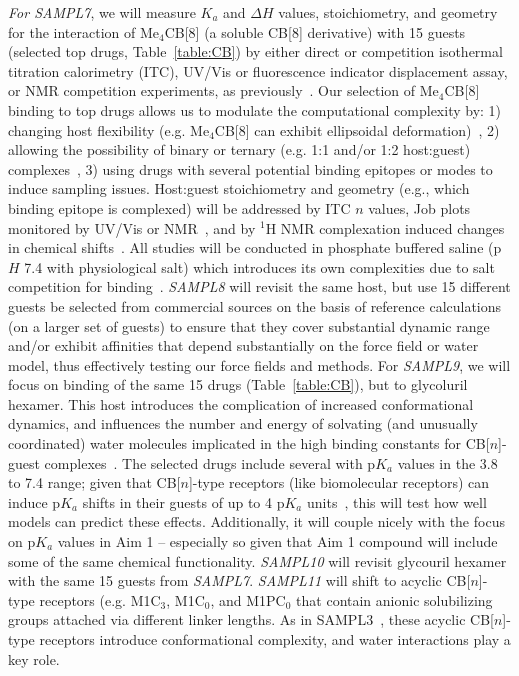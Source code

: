 \documentclass[11pt]{article}
\begin{document}
\emph{For SAMPL7}, we will measure $K_a$ and $\Delta H$ values, stoichiometry, and geometry for the interaction of Me$_4$CB[8] (a soluble CB[8] derivative) with 15 guests (selected top drugs, Table~\ref{table:CB}) by either direct or competition isothermal titration calorimetry (ITC), UV/Vis or fluorescence indicator displacement assay, or NMR competition experiments, as previously~\cite{cao_attomolar_2014, liu_cucurbituril_2005, ma_acyclic_2010, she_glycoluril-derived_2016}.  
Our selection of Me$_4$CB[8] binding to top drugs allows us to modulate the computational complexity by: 1) changing host flexibility (e.g. Me$_4$CB[8] can exhibit ellipsoidal deformation)~\cite{vinciguerra_synthesis_2015}, 2) allowing the possibility of binary or ternary (e.g. 1:1 and/or 1:2 host:guest) complexes~\cite{ko_supramolecular_2007, barrow_cucurbituril-based_2015, urbach_molecular_2011}, 3) using drugs with several potential binding epitopes or modes to induce sampling issues.  
Host:guest stoichiometry and geometry (e.g., which binding epitope is complexed) will be addressed by ITC $n$ values, Job plots monitored by UV/Vis or NMR~\cite{connors_binding_1987}, and by $^1$H NMR complexation induced changes in chemical shifts~\cite{masson_cucurbituril_2012}.  
All studies will be conducted in phosphate buffered saline (p$H$ 7.4 with physiological salt) which introduces its own complexities due to salt competition for binding~\cite{marquez_mechanism_2004, Mobley:2017:AnnualReviewofBiophysics}. 
\emph{SAMPL8} will revisit the same host, but use 15 different guests be selected from commercial sources on the basis of reference calculations (on a larger set of guests) to ensure that they cover substantial dynamic range and/or exhibit affinities that depend substantially on the force field or water model, thus effectively testing our force fields and methods.
For \emph{SAMPL9}, we will focus on binding of the same 15 drugs (Table~\ref{table:CB}), but to glycoluril hexamer. 
This host introduces the complication of increased conformational dynamics, and influences the number and energy of solvating (and unusually coordinated) water molecules implicated in the high binding constants for CB[$n$]-guest complexes~\cite{biedermann_release_2012, biedermann_hydrophobic_2014}.  
The selected drugs include several with p$K_a$ values in the 3.8 to 7.4 range; given that CB[$n$]-type receptors (like biomolecular receptors) can induce p$K_a$ shifts in their guests of up to 4 p$K_a$ units~\cite{saleh_activation_2008, nau_deep_2011, ghosh_strategic_2012}, this will test how well models can predict these effects. 
Additionally, it will couple nicely with the focus on p$K_a$ values in Aim 1 -- especially so given that Aim 1 compound will include some of the same chemical functionality.
\emph{SAMPL10} will revisit glycouril hexamer with the same 15 guests from \emph{SAMPL7}.
\emph{SAMPL11} will shift to acyclic CB[$n$]-type receptors (e.g. M1C$_3$, M1C$_0$, and M1PC$_0$ that contain anionic solubilizing groups attached via different linker lengths.  
As in SAMPL3~\cite{muddana_sampl3_2012}, these acyclic CB[$n$]-type receptors introduce conformational complexity, and water interactions play a key role.
\end{document}
